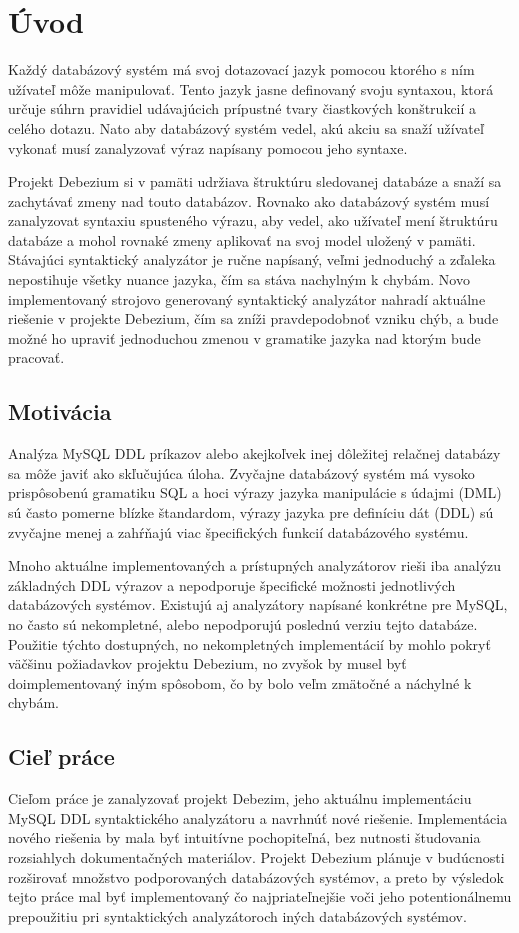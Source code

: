 \chapter{Úvod}
Každý databázový systém má svoj dotazovací jazyk pomocou ktorého s ním užívateľ môže manipulovať. Tento jazyk jasne definovaný svoju syntaxou, ktorá určuje súhrn pravidiel udávajúcich prípustné tvary čiastkových konštrukcií a celého dotazu. Nato aby databázový systém vedel, akú akciu sa snaží užívateľ vykonať musí zanalyzovať výraz napísany pomocou jeho syntaxe.

Projekt Debezium si v pamäti udržiava štruktúru sledovanej databáze a snaží sa zachytávať zmeny nad touto databázov. Rovnako ako databázový systém musí zanalyzovat syntaxiu spusteného výrazu, aby vedel, ako užívateľ mení štruktúru databáze a mohol rovnaké zmeny aplikovať na svoj model uložený v pamäti.
Stávajúci syntaktický analyzátor je ručne napísaný, veľmi jednoduchý a zďaleka nepostihuje všetky nuance  jazyka, čím sa stáva nachylným k chybám. Novo implementovaný strojovo generovaný syntaktický analyzátor nahradí aktuálne riešenie v projekte Debezium, čím sa zníži pravdepodobnoť vzniku chýb, a bude možné ho upraviť jednoduchou zmenou v gramatike jazyka nad ktorým bude pracovať.

\section{Motivácia}
Analýza MySQL DDL príkazov alebo akejkoľvek inej dôležitej relačnej databázy sa môže javiť ako skľučujúca úloha. Zvyčajne databázový systém má vysoko prispôsobenú gramatiku SQL a hoci výrazy jazyka manipulácie s údajmi (DML) sú často pomerne blízke štandardom, výrazy jazyka pre definíciu dát (DDL) sú zvyčajne menej a zahŕňajú viac špecifických funkcií databázového systému.

Mnoho aktuálne implementovaných a prístupných analyzátorov rieši iba analýzu základných DDL výrazov a nepodporuje špecifické možnosti jednotlivých databázových systémov. Existujú aj analyzátory napísané konkrétne pre MySQL, no často sú nekompletné, alebo nepodporujú poslednú verziu tejto databáze. Použitie týchto dostupných, no nekompletných implementácií by mohlo pokryť väčšinu požiadavkov projektu Debezium, no zvyšok by musel byť doimplementovaný iným spôsobom, čo by bolo veľm zmätočné a náchylné k chybám.

\section{Cieľ práce}
Cieľom práce je zanalyzovať projekt Debezim, jeho aktuálnu implementáciu MySQL DDL syntaktického analyzátoru a navrhnúť nové riešenie. Implementácia nového riešenia by mala byť intuitívne pochopiteľná, bez nutnosti študovania rozsiahlych dokumentačných materiálov. Projekt Debezium plánuje v budúcnosti rozširovať množstvo podporovaných databázových systémov, a preto by výsledok tejto práce mal byť implementovaný čo najpriateľnejšie voči jeho potentionálnemu prepoužitiu pri syntaktických analyzátoroch iných databázových systémov.